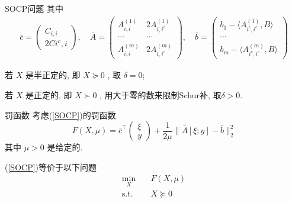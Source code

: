 \documentclass[slidestop, compress, mathserif, UTF8]{beamer}
\numberwithin{equation}{section}                                        %
\begin{document}
            \begin{frame}[t]{SOCP问题}
                其中
                \begin{equation}
					\begin{split}\label{SOCPCondition}
							\bar{c}
						=	\begin{pmatrix} C_{i, i} \\ 2C{i^c, i} \end{pmatrix} , \quad
							\bar{A}
						=	\begin{pmatrix}
								A^{(1)}_{i, i} & 2A^{(1)}_{i, i^c} \\
								\cdots & \cdots \\
								A^{(m)}_{i, i} & 2A^{(m)}_{i, i^c}
							\end{pmatrix} , \quad
							\bar{b}
						=	\begin{pmatrix}
								b_1 - \langle{A^{(1)}_{i^c, i^c}, B}\rangle \\
								\cdots \\
								b_m - \langle{A^{(m)}_{i^c, i^c}, B}\rangle 
							\end{pmatrix}
					\end{split}
				\end{equation}
                
                若 $X$ 是半正定的, 即 $X \succeq 0$ , 取 $\delta = 0$; 
                
                若 $X$ 是正定的, 即 $X \succ 0$ , 用大于零的数来限制Schur补, 取$\delta > 0$.
            \end{frame}
            \begin{frame}[t]{罚函数}
                考虑(\ref{SOCP})的罚函数
				\begin{equation}\label{Powell}
						F(X, \mu)
					=	\bar{c}^\top \begin{pmatrix}\xi \\ y\end{pmatrix} + \frac{1}{2\mu} \lVert{\bar{A}[\xi; y] - \bar{b}}\rVert^2_2
				\end{equation}
				其中 $\mu > 0$ 是给定的.

                (\ref{SOCP})等价于以下问题
                \begin{equation}
                    \begin{split}\label{PowellQ}
						\min_{X} \quad
							& F(X, \mu)\\
						\text{s.t.} \quad
							& X \succeq 0
					\end{split}
                \end{equation} 
            \end{frame}
\end{document}
